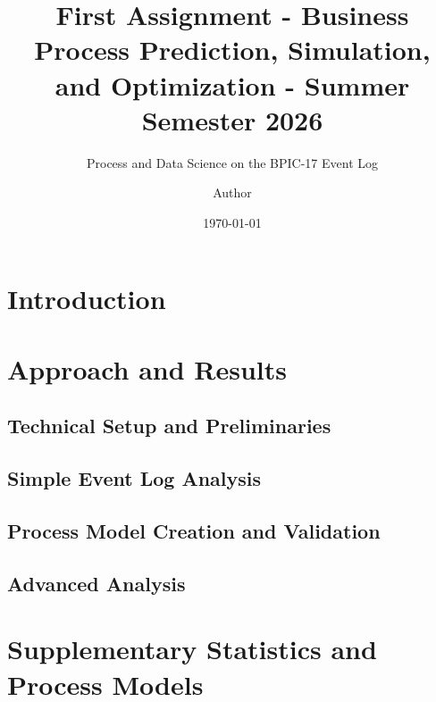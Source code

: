 \documentclass[
  english,
  font=times,
  twocolumn,
]{tumarticle}
\title{First Assignment - Business Process Prediction, Simulation, and Optimization - Summer Semester 2026}
\subtitle{Process and Data Science on the BPIC-17 Event Log}
\author{Author}
\date{\today}
\begin{document}
\maketitle

\begin{abstract}
\end{abstract}

\section{Introduction}


\section{Approach and Results}
\subsection{Technical Setup and Preliminaries}


\subsection{Simple Event Log Analysis}


\subsection{Process Model Creation and Validation}


\subsection{Advanced Analysis}






\clearpage
\onecolumn
\appendix
\section{Supplementary Statistics and Process Models}
\label{app:discovery}

\end{document}
